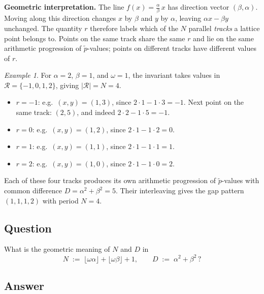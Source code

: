 \documentclass{amsart}
\theoremstyle{definition}
\theoremstyle{plain}
\theoremstyle{remark}
\newtheorem{exa}{Example}
\begin{document}
\noindent\textbf{Geometric interpretation.}
The line \(f(x) = \frac{\alpha}{\beta}\,x\) has direction vector
\((\beta, \alpha)\).  Moving along this direction changes \(x\) by \(\beta\) and
\(y\) by \(\alpha\), leaving \(\alpha x - \beta y\) unchanged.  The quantity \(r\)
therefore labels which of the \(N\) parallel \emph{tracks} a lattice point
belongs to.  Points on the same track share the same \(r\) and lie on the same
arithmetic progression of \(\tilde{p}\)-values; points on different tracks have
different values of \(r\).

\begin{exa}
For \(\alpha = 2\), \(\beta = 1\), and \(\omega = 1\), the invariant takes values
in \(\mathcal{R} = \{-1, 0, 1, 2\}\), giving \(|\mathcal{R}| = N = 4\).
\begin{itemize}
  \item \(r = -1\): e.g.\ \((x, y) = (1, 3)\), since \(2 \cdot 1 - 1 \cdot 3 = -1\).
    Next point on the same track: \((2, 5)\), and indeed \(2 \cdot 2 - 1 \cdot 5 = -1\).
  \item \(r = 0\): e.g.\ \((x, y) = (1, 2)\), since \(2 \cdot 1 - 1 \cdot 2 = 0\).
  \item \(r = 1\): e.g.\ \((x, y) = (1, 1)\), since \(2 \cdot 1 - 1 \cdot 1 = 1\).
  \item \(r = 2\): e.g.\ \((x, y) = (1, 0)\), since \(2 \cdot 1 - 1 \cdot 0 = 2\).
\end{itemize}
Each of these four tracks produces its own arithmetic progression of
\(\tilde{p}\)-values with common difference \(D = \alpha^2+\beta^2 = 5\).
Their interleaving gives the gap pattern \((1, 1, 1, 2)\) with period \(N = 4\).
\end{exa}

\subsection*{Question}

What is the geometric meaning of \(N\) and \(D\) in
\[
  N \;:=\; \lfloor\omega\alpha\rfloor + \lfloor\omega\beta\rfloor + 1,
  \qquad
  D \;:=\; \alpha^2 + \beta^2\,?
\]

\subsection*{Answer}
\end{document}
